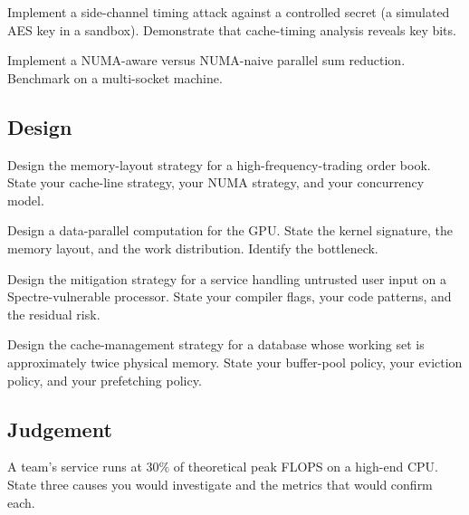 \begin{exercise}
Implement a side-channel timing attack against a controlled secret (a simulated AES key in a sandbox). Demonstrate that cache-timing analysis reveals key bits.
\end{exercise}

\begin{exercise}
Implement a NUMA-aware versus NUMA-naive parallel sum reduction. Benchmark on a multi-socket machine.
\end{exercise}

\subsection*{Design}

\begin{exercise}
Design the memory-layout strategy for a high-frequency-trading order book. State your cache-line strategy, your NUMA strategy, and your concurrency model.
\end{exercise}

\begin{exercise}
Design a data-parallel computation for the GPU. State the kernel signature, the memory layout, and the work distribution. Identify the bottleneck.
\end{exercise}

\begin{exercise}
Design the mitigation strategy for a service handling untrusted user input on a Spectre-vulnerable processor. State your compiler flags, your code patterns, and the residual risk.
\end{exercise}

\begin{exercise}
Design the cache-management strategy for a database whose working set is approximately twice physical memory. State your buffer-pool policy, your eviction policy, and your prefetching policy.
\end{exercise}

\subsection*{Judgement}

\begin{exercise}
A team's service runs at $30\%$ of theoretical peak FLOPS on a high-end CPU. State three causes you would investigate and the metrics that would confirm each.
\end{exercise}

